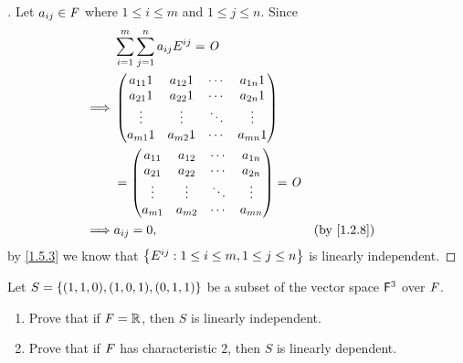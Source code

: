\begin{proof}[]
  Let \(a_{i j} \in \mathit{F}\) where \(1 \leq i \leq m\) and \(1 \leq j \leq n\).
  Since
  \begin{align*}
             & \sum_{i = 1}^m \sum_{j = 1}^{n} a_{i j} E^{i j} = \zm                               \\
    \implies & \begin{pmatrix}
                 a_{1 1} 1 & a_{1 2} 1 & \cdots & a_{1 n} 1 \\
                 a_{2 1} 1 & a_{2 2} 1 & \cdots & a_{2 n} 1 \\
                 \vdots    & \vdots    & \ddots & \vdots    \\
                 a_{m 1} 1 & a_{m 2} 1 & \cdots & a_{m n} 1
               \end{pmatrix}                                          \\
             & = \begin{pmatrix}
                   a_{1 1} & a_{1 2} & \cdots & a_{1 n} \\
                   a_{2 1} & a_{2 2} & \cdots & a_{2 n} \\
                   \vdots  & \vdots  & \ddots & \vdots  \\
                   a_{m 1} & a_{m 2} & \cdots & a_{m n}
                 \end{pmatrix} = \zm                                              \\
    \implies & a_{i j} = 0,                                          &  & \text{(by \cref{1.2.8})}
  \end{align*}
  by \cref{1.5.3} we know that \(\left\lbrace E^{i j} : 1 \leq i \leq m, 1 \leq j \leq n\right\rbrace\) is linearly independent.
\end{proof}

\setcounter{ex}{7}
\begin{ex}\label{ex:1.5.8}
  Let \(S = \left\lbrace(1, 1, 0), (1, 0, 1), (0, 1, 1)\right\rbrace\) be a subset of the vector space \(\mathsf{F}^3\) over \(\mathit{F}\).
  \begin{enumerate}
    \item Prove that if \(\mathit{F} = \mathbb{R}\), then \(S\) is linearly independent.
    \item Prove that if \(\mathit{F}\) has characteristic \(2\), then \(S\) is linearly dependent.
  \end{enumerate}
\end{ex}

